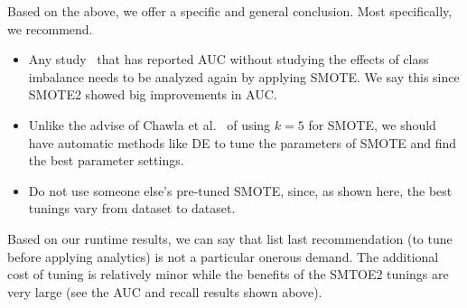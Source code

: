 \documentclass[10pt,conference]{IEEEtran}
\newcommand{\bi}{\begin{itemize}[leftmargin=0.4cm]}
\newcommand{\ei}{\end{itemize}}
\theoremstyle{break}
\theoremstyle{break}
\begin{document}
Based on the above, we offer a specific and general conclusion. Most specifically, we recommend.
\bi
 \item Any study~\cite{ghotra2015revisiting} that has reported AUC without studying the effects of class imbalance needs to be analyzed again by applying SMOTE. We say this since SMOTE2 showed big improvements in AUC.
 \item Unlike the advise of Chawla et al.~\cite{chawla2002smote} of using $k=5$ for SMOTE, we should have automatic methods like DE to tune the parameters of SMOTE and find the best parameter settings.
 \item Do not use someone else's pre-tuned SMOTE, since, as shown here, the best tunings vary from dataset to dataset.
\ei
Based on our runtime results, we can say that list last
recommendation (to tune before applying analytics) is not  a particular
onerous demand. The additional cost of tuning
is relatively minor while the benefits of the SMTOE2 tunings
are very large (see the   AUC and recall results shown above).



\balance



%
\medskip

\end{document}
